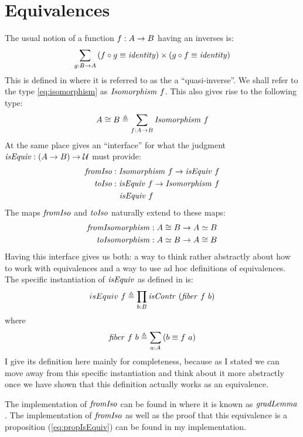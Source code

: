 \section{Equivalences}
\label{sec:equiv}
The usual notion of a function $f \mathrel{:} A \to B$ having an inverses is:
%
\begin{equation}
\label{eq:isomorphism}
\sum_{g \tp B \to A} \left( f \comp g \equiv \identity \right) \x \left( g \comp f \equiv \identity \right)
\end{equation}
%
This is defined in \cite[p. 129]{hott-2013} where it is referred to as the a
``quasi-inverse''. We shall refer to the type \ref{eq:isomorphism} as
$\Isomorphism\ f$. This also gives rise to the following type:
%
\begin{equation}
A \cong B \defeq \sum_{f \tp A \to B} \Isomorphism\ f
\end{equation}
%
At the same place \cite{hott-2013} gives an ``interface'' for what the judgment
$\isEquiv \tp (A \to B) \to \MCU$ must provide:
%
\begin{align}
\var{fromIso}   & \tp \Isomorphism\ f \to \isEquiv\ f \\
\var{toIso}     & \tp \isEquiv\ f \to \Isomorphism\ f \\
\label{eq:propIsEquiv}
                &\mathrel{\ } \isEquiv\ f
\end{align}
%
The maps $\mathit{fromIso}$ and $\mathit{toIso}$ naturally extend to these maps:
%
\begin{align}
\mathit{fromIsomorphism} & \mathrel{:} A \cong B \to A \simeq B \\
\mathit{toIsomorphism}   & \mathrel{:} A \simeq B \to A \cong B
\end{align}
%
Having this interface gives us both: a way to think rather abstractly about how
to work with equivalences and a way to use ad hoc definitions of equivalences.
The specific instantiation of $\isEquiv$ as defined in \cite{cubical-agda} is:
%
$$
isEquiv\ f \defeq \prod_{b \tp B} \isContr\ (\fiber\ f\ b)
$$
where
$$
\fiber\ f\ b \defeq \sum_{a \tp A} \left( b \equiv f\ a \right)
$$
%
I give its definition here mainly for completeness, because as I stated we can
move away from this specific instantiation and think about it more abstractly
once we have shown that this definition actually works as an equivalence.

The implementation of $\mathit{fromIso}$ can be found in
\cite{cubical-agda} where it is known as $\mathit{gradLemma}$. The
implementation of $\mathit{fromIso}$ as well as the proof that this
equivalence is a proposition (\ref{eq:propIsEquiv}) can be found in my
implementation.

